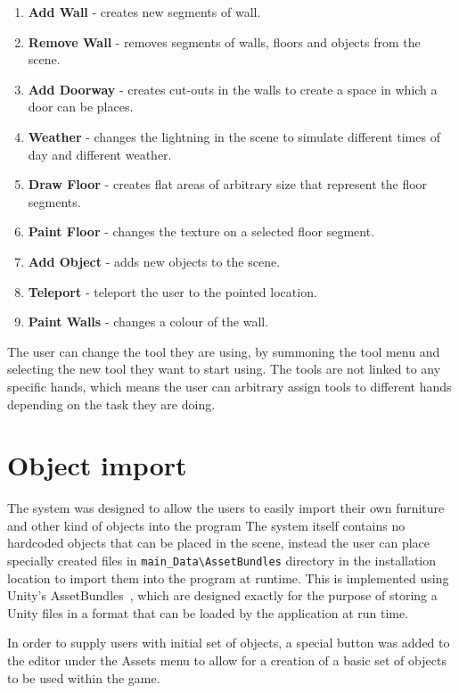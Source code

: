\begin{enumerate}
    \item \textbf{Add Wall} - creates new segments of wall.
    \item \textbf{Remove Wall} - removes segments of walls, floors and objects from the scene.
    \item \textbf{Add Doorway} - creates cut-outs in the walls to create a space in which a door can be places.
    \item \textbf{Weather} - changes the lightning in the scene to simulate different times of day and different weather.
    \item \textbf{Draw Floor} - creates flat areas of arbitrary size that represent the floor segments.
    \item \textbf{Paint Floor} - changes the texture on a selected floor segment.
    \item \textbf{Add Object} - adds new objects to the scene.
    \item \textbf{Teleport} - teleport the user to the pointed location.
    \item \textbf{Paint Walls} - changes a colour of the wall.
\end{enumerate}

The user can change the tool they are using, by summoning the tool menu and selecting the new tool they want to start using. The tools are not linked to any specific hands, which means the user can arbitrary assign tools to different hands depending on the task they are doing.

\section{Object import}
The system was designed to allow the users to easily import their own furniture and other kind of objects into the program The system itself contains no hardcoded objects that can be placed in the scene, instead the user can place specially created files in \verb|main_Data\AssetBundles| directory in the installation location to import them into the program at runtime. This is implemented using Unity's AssetBundles~\cite{unity:assetbundle}, which are designed exactly for the purpose of storing a Unity files in a format that can be loaded by the application at run time.

In order to supply users with initial set of objects, a special button was added to the editor under the Assets menu to allow for a creation of a basic set of objects to be used within the game.

